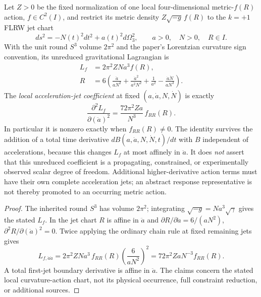 \documentclass[12pt,a4paper]{article}
\begin{document}
\begin{theorem}
\label{p3e:thm:v287-s3-acceleration-hessian}
Let $Z>0$ be the fixed normalization of one local four-dimensional
metric-$f(R)$ action, $f\in C^2(I)$, and restrict its metric density
$Z\sqrt{-g}\,f(R)$ to the $k=+1$ FLRW jet chart
\[
 ds^2=-N(t)^2dt^2+a(t)^2d\Omega_3^2,
 \qquad a>0,\quad N>0,\quad R\in I.
\]
With the unit round $S^3$ volume $2\pi^2$ and the paper's Lorentzian
curvature sign convention, its unreduced gravitational Lagrangian is
\begin{align}
 L_f&=2\pi^2ZNa^3 f(R),\nonumber\\
 R&=6\left(
 \frac{\ddot a}{aN^2}+\frac{\dot a^2}{a^2N^2}
 +\frac1{a^2}-\frac{\dot a\dot N}{aN^3}\right).
 \label{p3e:eq:v287-s3-flrw-curvature}
\end{align}
The \emph{local acceleration-jet coefficient} at fixed
$(a,\dot a,N,\dot N)$ is exactly
\begin{equation}\label{p3e:eq:v287-s3-acceleration-hessian}
 \boxed{\frac{\partial^2 L_f}{\partial(\ddot a)^2}
       =\frac{72\pi^2Za}{N^3}\,f_{RR}(R).}
\end{equation}
In particular it is nonzero exactly when $f_{RR}(R)\ne0$.
The identity survives the addition of a total time derivative
$dB(a,\dot a,N,\dot N,t)/dt$ with $B$ independent of accelerations,
because this changes $L_f$ at most affinely in $\ddot a$.
It does \emph{not} assert that this unreduced coefficient is a
propagating, constrained, or experimentally observed scalar degree of
freedom. Additional higher-derivative action terms must have their own
complete acceleration jets; an abstract response representative is not
thereby promoted to an occurring metric action.
\end{theorem}
\begin{proof}
The inherited round $S^3$ has volume $2\pi^2$; integrating
$\sqrt{-g}=Na^3\sqrt{\gamma}$ gives the stated $L_f$.
In the jet chart $R$ is affine in $\ddot a$ and
$\partial R/\partial\ddot a=6/(aN^2)$,
$\partial^2R/\partial(\ddot a)^2=0$.
Twice applying the ordinary chain rule at fixed remaining jets gives
\[
 L_{f,\ddot a\ddot a}
 =2\pi^2ZNa^3\,f_{RR}(R)
 \left(\frac6{aN^2}\right)^2
 =72\pi^2ZaN^{-3}f_{RR}(R).
\]
A total first-jet boundary derivative is affine in $\ddot a$.
The claims concern the stated local curvature-action chart, not its
physical occurrence, full constraint reduction, or additional sources.
\end{proof}
\end{document}
